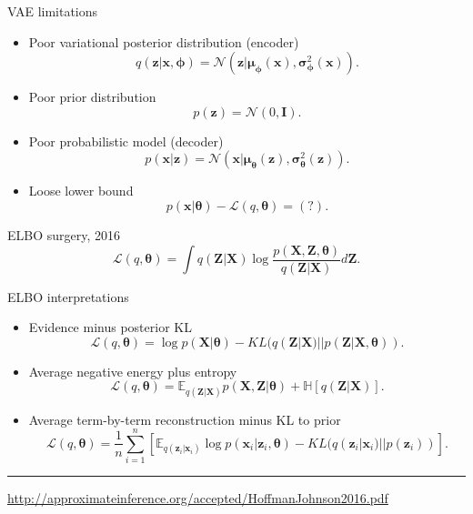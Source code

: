 \documentclass{beamer}
\newcommand{\bx}{\mathbf{x}}
\newcommand{\bz}{\mathbf{z}}
\newcommand{\bX}{\mathbf{X}}
\newcommand{\bZ}{\mathbf{Z}}
\newcommand{\bmu}{\boldsymbol{\mu}}
\newcommand{\bsigma}{\boldsymbol{\sigma}}
\newcommand{\btheta}{\boldsymbol{\theta}}
\newcommand{\bphi}{\boldsymbol{\phi}}
\begin{document}
\begin{frame}{VAE limitations}
\begin{itemize}
	\item Poor variational posterior distribution (encoder)
	\[
		q(\bz | \bx, \bphi) = \mathcal{N}(\bz| \bmu_{\bphi}(\bx), \bsigma^2_{\bphi}(\bx)).
	\]
	\item Poor prior distribution
	\[
		p(\bz) = \mathcal{N}(0, \mathbf{I}).
	\]
	\item Poor probabilistic model (decoder)
	\[
		p(\bx | \bz) = \mathcal{N}(\bx| \bmu_{\btheta}(\bz), \bsigma^2_{\btheta}(\bz)).
	\]
	\item Loose lower bound
	\[
		p(\bx | \btheta) - \mathcal{L}(q, \btheta) = (?).
	\]
\end{itemize}
\end{frame}
\begin{frame}{ELBO surgery, 2016}
		\[
			\mathcal{L} (q, \btheta)  = \int q(\bZ | \bX) \log \frac{p(\bX, \bZ, \btheta)}{q(\bZ | \bX)} d\bZ.
		\]
		\vspace{-0.1cm}
	\begin{block}{ELBO interpretations}
	\begin{itemize}
	    \item Evidence minus posterior KL
	    \vspace{-0.1cm}
	    \[
	        \mathcal{L}(q, \btheta) = \log p(\bX | \btheta) - KL(q(\bZ | \bX) || p(\bZ | \bX, \btheta)).
	    \]
	    \item Average negative energy plus entropy
	    \vspace{-0.1cm}
	    \[
	        \mathcal{L}(q, \btheta) = \mathbb{E}_{q(\bZ | \bX)} p(\bX, \bZ | \btheta) + \mathbb{H} \left[q(\bZ | \bX) \right].
	    \]
	    \item Average term-by-term reconstruction minus KL to prior
	    \vspace{-0.1cm}
	    \[
	        \mathcal{L}(q, \btheta) = \frac{1}{n} \sum_{i=1}^n \left[ \mathbb{E}_{q(\bz_i | \bx_i)} \log p(\bx_i | \bz_i, \btheta) - KL(q(\bz_i | \bx_i) || p(\bz_i)) \right].
	    \]
	\end{itemize}
	\end{block}
	
	\vfill
	\hrule\medskip
	{\scriptsize \href{http://approximateinference.org/accepted/HoffmanJohnson2016.pdf}{http://approximateinference.org/accepted/HoffmanJohnson2016.pdf}}
\end{frame}
\end{document}
